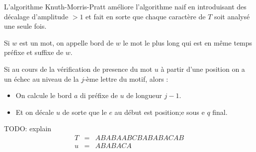 L'algorithme Knuth-Morris-Pratt améliore l'algorithme naif en introduisant des décalage d'amplitude
$> 1$ et fait en sorte que chaque caractère de $T$ soit analysé une seule fois.


\begin{definition}
	Si $w$ est un mot, on appelle bord de $w$ le mot le plus long qui est en même temps préfixe et suffixe de $w$.
\end{definition}

Si au cours de la vérification de presence du mot $u$ à partir d'une position
on a un échec au niveau de la $j$-ème lettre du motif, alors :

\begin{itemize}
	\item On calcule le bord $a$ di préfixe de $u$ de longueur $j-1$.
	\item Et on décale $u$ de sorte que le $e$ au début est position;e sous e $q$ final.
\end{itemize}

\begin{exemple}
	TODO: explain
	\begin{eqnarray*}
		T &=&  ABABAABCBABABACAB \\
		u &=& ABABACA
	\end{eqnarray*}
\end{exemple}
